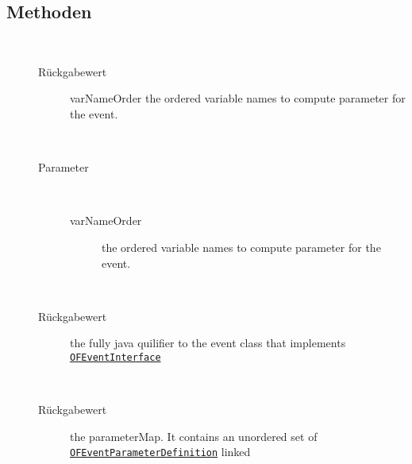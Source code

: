 \subsection{Methoden}
\begin{description}
\item[{\label{ontologyFramework.OFEventManagement.OFEventRepresentation.getOrder()}}]
~ 
\begin{description}
\item[Rückgabewert] 
varNameOrder the ordered variable names to compute parameter for the event.
\end{description}
\item[{\label{ontologyFramework.OFEventManagement.OFEventRepresentation.setOrder(java.util.List<java.lang.String>)}}]
~ 
\begin{description}
\item[Parameter] ~
\begin{description}
\item[varNameOrder]
the ordered variable names to compute parameter for the event.
\end{description}
\end{description}
\item[{\label{ontologyFramework.OFEventManagement.OFEventRepresentation.getClassName()}}]
~ 
\begin{description}
\item[Rückgabewert] 
the fully java quilifier to the event class that implements \texttt{\hyperlink{ontologyFramework.OFEventManagement.OFLogicalEventManagement.OFEventInterface-class}{OFEventInterface}}
\end{description}
\item[{\label{ontologyFramework.OFEventManagement.OFEventRepresentation.getParameterMap()}}]
~ 
\begin{description}
\item[Rückgabewert] 
the parameterMap. It contains an unordered set of \texttt{\hyperlink{ontologyFramework.OFEventManagement.OFEventParameterDefinition-class}{OFEventParameterDefinition}} linked

\end{description}
\end{description}
